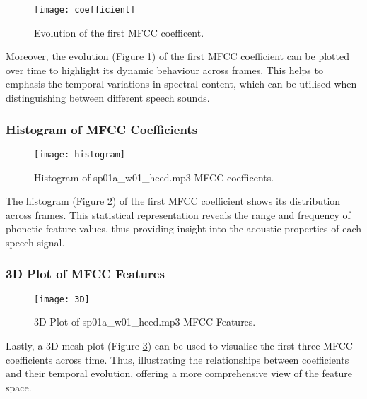 \documentclass{article}
\begin{document}
\begin{figure}[!h]
\begin{center}
\texttt{[image: coefficient]}
\end{center}
\caption{\label{fig:coefficient} Evolution of the first MFCC coefficent.}
\end{figure}

Moreover, the evolution (Figure \ref{fig:coefficient}) of the first MFCC coefficient can be plotted over time to highlight its dynamic behaviour across frames. This helps to emphasis the temporal variations in spectral content, which can be utilised when distinguishing between different speech sounds.


\subsubsection{Histogram of MFCC Coefficients}

\begin{figure}[!h]
\begin{center}
\texttt{[image: histogram]}
\end{center}
\caption{\label{fig:histogram} Histogram of sp01a\_w01\_heed.mp3 MFCC coefficents.}
\end{figure}

The histogram (Figure \ref{fig:histogram}) of the first MFCC coefficient shows its distribution across frames. This statistical representation reveals the range and frequency of phonetic feature values, thus providing insight into the acoustic properties of each speech signal.


\subsubsection{3D Plot of MFCC Features}

\begin{figure}[!h]
\begin{center}
\texttt{[image: 3D]}
\end{center}
\caption{\label{fig:3D} 3D Plot of sp01a\_w01\_heed.mp3 MFCC Features.}
\end{figure}

Lastly, a 3D mesh plot (Figure \ref{fig:3D}) can be used to visualise the first three MFCC coefficients across time. Thus, illustrating the relationships between coefficients and their temporal evolution, offering a more comprehensive view of the feature space.
\end{document}
